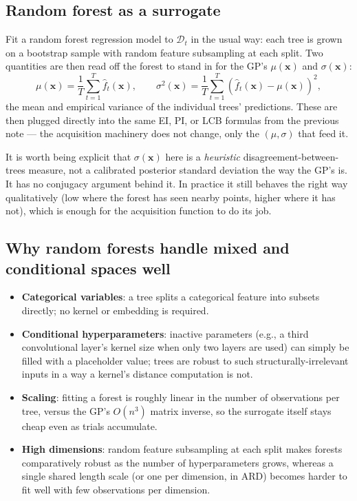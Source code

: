 \documentclass[conference]{IEEEtran}
\begin{document}
\subsection*{Random forest as a surrogate}
Fit a random forest regression model to $\mathcal{D}_t$ in the usual way: each tree is grown on a bootstrap sample with random feature subsampling at each split. Two quantities are then read off the forest to stand in for the GP's $\mu(\mathbf{x})$ and $\sigma(\mathbf{x})$:
\begin{equation}
    \mu(\mathbf{x}) = \frac{1}{T}\sum_{t=1}^{T} \hat{f}_t(\mathbf{x}), \qquad
    \sigma^2(\mathbf{x}) = \frac{1}{T}\sum_{t=1}^{T}\left(\hat{f}_t(\mathbf{x}) - \mu(\mathbf{x})\right)^2,
\end{equation}
the mean and empirical variance of the individual trees' predictions. These are then plugged directly into the same EI, PI, or LCB formulas from the previous note --- the acquisition machinery does not change, only the $(\mu, \sigma)$ that feed it.

It is worth being explicit that $\sigma(\mathbf{x})$ here is a \textit{heuristic} disagreement-between-trees measure, not a calibrated posterior standard deviation the way the GP's is. It has no conjugacy argument behind it. In practice it still behaves the right way qualitatively (low where the forest has seen nearby points, higher where it has not), which is enough for the acquisition function to do its job.

\subsection*{Why random forests handle mixed and conditional spaces well}
\begin{itemize}
    \item \textbf{Categorical variables}: a tree splits a categorical feature into subsets directly; no kernel or embedding is required.
    \item \textbf{Conditional hyperparameters}: inactive parameters (e.g., a third convolutional layer's kernel size when only two layers are used) can simply be filled with a placeholder value; trees are robust to such structurally-irrelevant inputs in a way a kernel's distance computation is not.
    \item \textbf{Scaling}: fitting a forest is roughly linear in the number of observations per tree, versus the GP's $O(n^3)$ matrix inverse, so the surrogate itself stays cheap even as trials accumulate.
    \item \textbf{High dimensions}: random feature subsampling at each split makes forests comparatively robust as the number of hyperparameters grows, whereas a single shared length scale (or one per dimension, in ARD) becomes harder to fit well with few observations per dimension.
\end{itemize}
\end{document}
